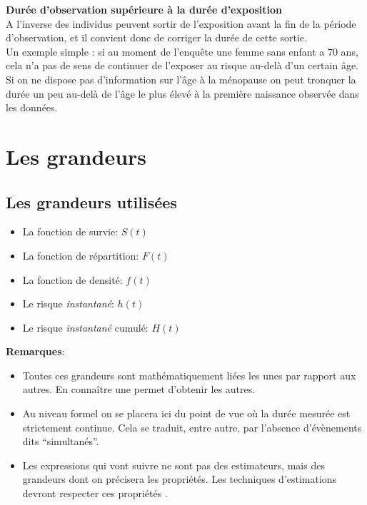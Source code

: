 \documentclass[
  12pt,
  letterpaper,
  DIV=11,
  numbers=noendperiod,
  onepage,
  openany]{scrreprt}
\providecommand{\tightlist}{%
  \setlength{\itemsep}{0pt}\setlength{\parskip}{0pt}}\usepackage{longtable,booktabs,array}
\begin{document}
\textbf{Durée d'observation supérieure à la durée d'exposition}\\
A l'inverse des individus peuvent sortir de l'exposition avant la fin de
la période d'observation, et il convient donc de corriger la durée de
cette sortie.\\
Un exemple simple : si au moment de l'enquête une femme sans enfant a 70
ans, cela n'a pas de sens de continuer de l'exposer au risque au-delà
d'un certain âge. Si on ne dispose pas d'information sur l'âge à la
ménopause on peut tronquer la durée un peu au-delà de l'âge le plus
élevé à la première naissance observée dans les données.

\hypertarget{les-grandeurs}{%
\section{\texorpdfstring{\textbf{Les
grandeurs}}{Les grandeurs}}\label{les-grandeurs}}

\hypertarget{les-grandeurs-utilisuxe9es}{%
\subsection{\texorpdfstring{\textbf{Les grandeurs
utilisées}}{Les grandeurs utilisées}}\label{les-grandeurs-utilisuxe9es}}

\begin{itemize}
\item
  La fonction de survie: \textbf{\(S(t)\)}
\item
  La fonction de répartition: \textbf{\(F(t)\)}
\item
  La fonction de densité: \textbf{\(f(t)\)}
\item
  Le risque \emph{instantané}: \textbf{\(h(t)\)}
\item
  Le risque \emph{instantané} cumulé: \textbf{\(H(t)\)}
\end{itemize}

\textbf{Remarques}:

\begin{itemize}
\tightlist
\item
  Toutes ces grandeurs sont mathématiquement liées les unes par rapport
  aux autres. En connaître une permet d'obtenir les autres.\\
\item
  Au niveau formel on se placera ici du point de vue où la durée mesurée
  est strictement continue. Cela se traduit, entre autre, par l'absence
  d'évènements dits ``simultanés''.
\item
  Les expressions qui vont suivre ne sont pas des estimateurs, mais des
  grandeurs dont on précisera les propriétés. Les techniques
  d'estimations devront respecter ces propriétés .
\end{itemize}
\end{document}
